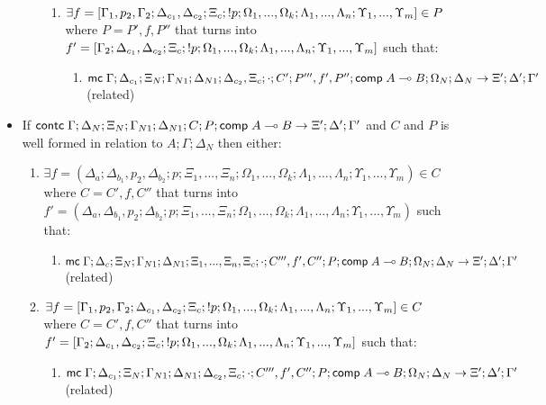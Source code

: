 \begin{theorem}
\begin{itemize}
\begin{enumerate}
\begin{enumerate}
            \item $\exists f = [\Gamma_1, p_2, \Gamma_2; \Delta_{c_1}, \Delta_{c_2}; \Xi_c; {!} p; \Omega_1, ..., \Omega_k; \Lambda_1, ..., \Lambda_n; \Upsilon_1, ..., \Upsilon_m] \in P$ where $P = P', f, P''$ that turns into $f' = [\Gamma_2; \Delta_{c_1}, \Delta_{c_2}; \Xi_c; {!} p; \Omega_1, ..., \Omega_k; \Lambda_1, ..., \Lambda_n; \Upsilon_1, ..., \Upsilon_m]$ such that:
                  \begin{enumerate}
                     \item $\mathsf{mc} \; \Gamma; \Delta_{c_1}; \Xi_N; \Gamma_{N1}; \Delta_{N1}; \Delta_{c_2}, \Xi_c; \cdot; C'; P''', f', P''; \mathsf{comp} \; A \multimap B; \Omega_N; \Delta_N \rightarrow \Xi'; \Delta'; \Gamma'$ (related)
                  \end{enumerate}
         \end{enumerate}
      \end{enumerate}
      
   \item If $\mathsf{contc} \; \Gamma; \Delta_{N}; \Xi_{N}; \Gamma_{N1}; \Delta_{N1}; C; P; \mathsf{comp} \; A \multimap B \rightarrow \Xi'; \Delta'; \Gamma'$ and $C$ and $P$ is well formed in relation to $A; \Gamma; \Delta_N$ then either:
   
   \begin{enumerate}
      \item $\exists f = (\Delta_a; \Delta_{b_1}, p_2, \Delta_{b_2}; p; \Xi_1, ..., \Xi_n; \Omega_1, ..., \Omega_k; \Lambda_1, ..., \Lambda_n; \Upsilon_1, ..., \Upsilon_m) \in C$ where $C = C', f, C''$ that turns into $f' = (\Delta_a, \Delta_{b_1}, p_2; \Delta_{b_2}; p; \Xi_1, ..., \Xi_n; \Omega_1, ..., \Omega_k; \Lambda_1, ..., \Lambda_n; \Upsilon_1, ..., \Upsilon_m)$ such that:
         \begin{enumerate}
            \item $\mathsf{mc} \; \Gamma; \Delta_c; \Xi_N; \Gamma_{N1}; \Delta_{N1}; \Xi_1, ..., \Xi_n, \Xi_c; \cdot; C''', f', C''; P; \mathsf{comp} \; A \multimap B; \Omega_N; \Delta_N \rightarrow \Xi'; \Delta'; \Gamma'$ (related)
         \end{enumerate}
         
      \item $\exists f = [\Gamma_1, p_2, \Gamma_2; \Delta_{c_1}, \Delta_{c_2}; \Xi_c; {!} p; \Omega_1, ..., \Omega_k; \Lambda_1, ..., \Lambda_n; \Upsilon_1, ..., \Upsilon_m] \in C$ where $C = C', f, C''$ that turns into $f' = [\Gamma_2; \Delta_{c_1}, \Delta_{c_2}; \Xi_c; {!} p; \Omega_1, ..., \Omega_k; \Lambda_1, ..., \Lambda_n; \Upsilon_1, ..., \Upsilon_m]$ such that:
         \begin{enumerate}
            \item $\mathsf{mc} \; \Gamma; \Delta_{c_1}; \Xi_N; \Gamma_{N1}; \Delta_{N1}; \Delta_{c_2}, \Xi_c; \cdot; C''', f', C''; P; \mathsf{comp} \; A \multimap B; \Omega_N; \Delta_N \rightarrow \Xi'; \Delta'; \Gamma'$ (related)
         \end{enumerate}
         

\end{enumerate}
\end{itemize}
\end{theorem}
